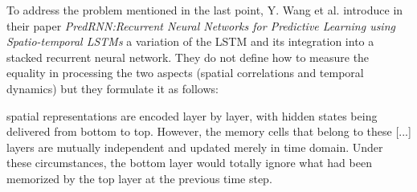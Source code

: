 
To address the problem mentioned in the last point, Y. Wang et al. introduce in their paper \textit{PredRNN:Recurrent Neural Networks for Predictive Learning using Spatio-temporal LSTMs}\cite{prednet} a variation of the LSTM and its integration into a stacked recurrent neural network. They do not define how to measure the equality in processing the two aspects (spatial correlations and temporal dynamics) but they formulate it as follows:

\begin{itquote}
[...] spatial representations are encoded layer by layer, with hidden states being delivered from bottom to top. However, the memory cells that belong to these [...] layers are mutually independent and updated merely in time domain. Under these circumstances, the bottom layer would totally ignore what had been memorized by the top layer at the previous time step.
\end{itquote}

